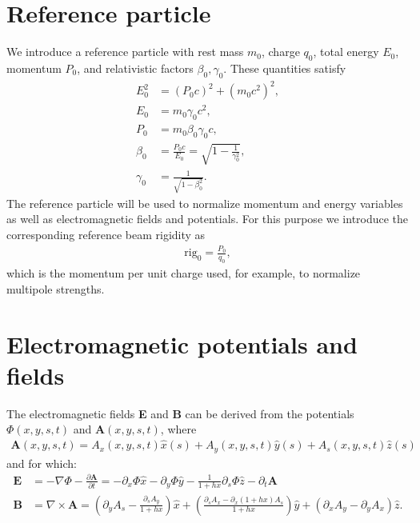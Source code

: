 \section{Reference particle}

We introduce a reference particle with rest mass $m_0$, charge $q_0$, total energy $E_0$,
momentum $P_0$, and relativistic factors $\beta_0,\gamma_0$. These quantities satisfy
\begin{align}
  E_0^2 &= (P_0 c)^2 + (m_0 c^2)^2, \\
  E_0 &=  m_0 \gamma_0 c^2, \\
  P_0 &= m_0 \beta_0 \gamma_0 c, \\
  \beta_0 &= \frac{P_0 c}{E_0} = \sqrt{1-\frac{1}{\gamma_0^2}}, \\
  \gamma_0 &= \frac{1}{\sqrt{1-\beta_0^2}} .
\end{align}
The reference particle will be used to normalize momentum and energy variables as
well as electromagnetic fields and potentials.
For this purpose we introduce the corresponding reference beam rigidity as
\begin{align}
  \label{eq:brigidity}
  \mathrm{rig}_0 = \frac{P_0}{q_0},
\end{align}
which is the momentum per unit charge used, for example, to normalize multipole strengths.

\section{Electromagnetic potentials and fields}
\label{sec:electromagnetic_potentials_and_fields}
The electromagnetic fields {\bf E} and {\bf B} can be derived from the potentials $\Phi(x,y,s,t)$ and $\mathbf{A}(x,y,s,t)$, where
\begin{align}
\mathbf{A}(x,y,s,t)=A_x(x,y,s,t) \hat x(s) + A_y(x,y,s,t) \hat y(s) + A_s(x,y,s,t) \hat z(s)
\end{align}
and for which:
\begin{align}
  \mathbf{E}  &= -\nabla \Phi - \frac{\partial \mathbf{A}}{\partial t}
               = -\partial_x \Phi \hat x - \partial_y \Phi \hat y -
  \frac{1}{1+h x}  \partial_s \Phi \hat z - \partial_t \mathbf{A}\\
  \mathbf{B} &= \nabla\times\mathbf{A}  =
  \left(\partial_y A_s - \frac{\partial_s  A_y}{1+h x} \right) \hat x
  +\left(\frac{\partial_s A_x-\partial_x (1+h x) A_s }{1+h x} \right)\hat y
  + \left(\partial_x A_y - \partial_y A_x \right) \hat z. \label{eq:Bfield_from_a_curved}
\end{align}

